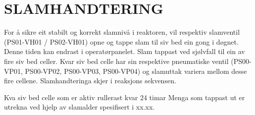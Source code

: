 \newpage
\section{SLAMHANDTERING}
For å sikre eit stabilt og korrekt slamnivå i reaktoren, vil respektiv slamventil (PS01-VH01 / PS02-VH01) opne og tappe slam til siv bed ein gong i døgnet.
 Denne tiden kan endrast i operatørpanelet. Slam tappast ved sjølvfall til ein av fire siv bed celler. 
 Kvar siv bed celle har sin respektive pneumatiske ventil (PS00-VP01, PS00-VP02, PS00-VP03, PS00-VP04) og slamuttak variera mellom desse fire cellene. Slamhandteringa skjer i reaksjons sekvensen.

Kva siv bed celle som er aktiv rullerast kvar 24 timar
Menga som tappast ut er utrekna ved hjelp av slamalder spesifisert i xx.xx.